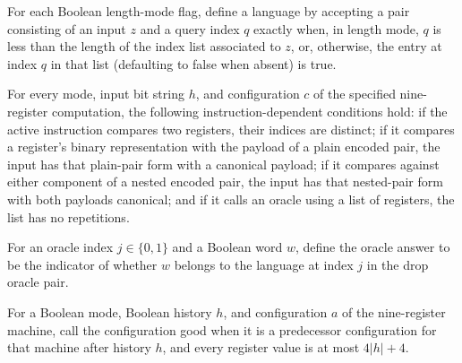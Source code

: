 \begin{definition}
\label{Complexity.dropLang}
\leanok
{}
For each Boolean length-mode flag, define a language by accepting a pair consisting of
an input $z$ and a query index $q$ exactly when, in length mode, $q$ is less than the
length of the index list associated to $z$, or, otherwise, the entry at index $q$ in
that list (defaulting to false when absent) is true.
\end{definition}

\begin{lemma}
\label{Complexity.drop_preS}
\leanok
{}
For every mode, input bit string $h$, and configuration $c$ of the specified
nine-register computation, the following instruction-dependent conditions hold: if the
active instruction compares two registers, their indices are distinct; if it compares a
register’s binary representation with the payload of a plain encoded pair, the input has
that plain-pair form with a canonical payload; if it compares against either component
of a nested encoded pair, the input has that nested-pair form with both payloads
canonical; and if it calls an oracle using a list of registers, the list has no
repetitions.
\end{lemma}

\begin{definition}
\label{Complexity.dropOracle}
\leanok
{}
For an oracle index $j\in\{0,1\}$ and a Boolean word $w$, define the oracle answer to be
the indicator of whether $w$ belongs to the language at index $j$ in the drop oracle
pair.
\end{definition}

\begin{definition}
\label{Complexity.DropGood}
\leanok
{}
For a Boolean mode, Boolean history $h$, and configuration $a$ of the nine-register
machine, call the configuration good when it is a predecessor configuration for that
machine after history $h$, and every register value is at most $4|h|+4$.
\end{definition}

